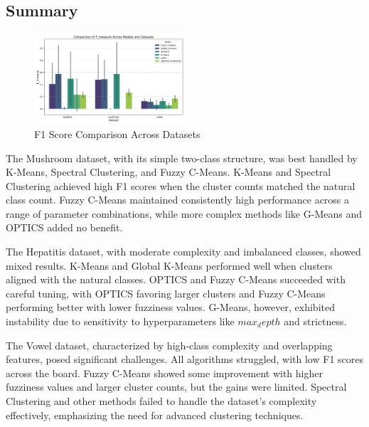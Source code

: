 \subsection{Summary}
\label{subsec:resultssummary}

\begin{figure}[h!]
    \centering
    \includegraphics[width=0.5\textwidth]{figures/model_comparison_f_measure.png}
    \caption{F1 Score Comparison Across Datasets}
    \label{fig:interactions-global-kmeans}
\end{figure}

The Mushroom dataset, with its simple two-class structure, was best handled by K-Means,
Spectral Clustering, and Fuzzy C-Means. K-Means and Spectral Clustering achieved high F1 
scores when the cluster counts matched the natural class count. Fuzzy C-Means maintained
consistently high performance across a range of parameter combinations, while more complex 
methods like G-Means and OPTICS added no benefit.

The Hepatitis dataset, with moderate complexity and imbalanced classes, showed mixed results.
K-Means and Global K-Means performed well when clusters aligned with the natural classes. 
OPTICS and Fuzzy C-Means succeeded with careful tuning, with OPTICS favoring larger clusters and Fuzzy C-Means performing better with lower fuzziness values.
G-Means, however, exhibited instability due to sensitivity to hyperparameters like $max_depth$ and strictness.

The Vowel dataset, characterized by high-class complexity and overlapping 
features, posed significant challenges. All algorithms struggled, with low F1 
scores across the board. Fuzzy C-Means showed some improvement with higher fuzziness 
values and larger cluster counts, but the gains were limited. Spectral Clustering 
and other methods failed to handle the dataset's complexity effectively, emphasizing the need for advanced clustering techniques.